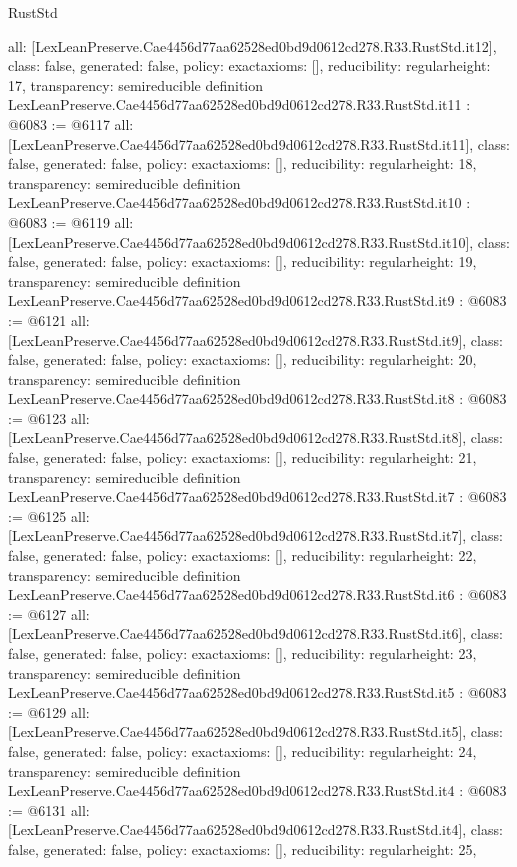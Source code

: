 \begin{lexlean}{RustStd}
\begin{coremodule}
{  all: [LexLeanPreserve.Cae4456d77aa62528ed0bd9d0612cd278.R33.RustStd.it12],
  class: false,
  generated: false,
  policy: exact{axioms: []},
  reducibility: regular{height: 17},
  transparency: semireducible
}
definition LexLeanPreserve.Cae4456d77aa62528ed0bd9d0612cd278.R33.RustStd.it11 : @6083 := @6117 {
  all: [LexLeanPreserve.Cae4456d77aa62528ed0bd9d0612cd278.R33.RustStd.it11],
  class: false,
  generated: false,
  policy: exact{axioms: []},
  reducibility: regular{height: 18},
  transparency: semireducible
}
definition LexLeanPreserve.Cae4456d77aa62528ed0bd9d0612cd278.R33.RustStd.it10 : @6083 := @6119 {
  all: [LexLeanPreserve.Cae4456d77aa62528ed0bd9d0612cd278.R33.RustStd.it10],
  class: false,
  generated: false,
  policy: exact{axioms: []},
  reducibility: regular{height: 19},
  transparency: semireducible
}
definition LexLeanPreserve.Cae4456d77aa62528ed0bd9d0612cd278.R33.RustStd.it9 : @6083 := @6121 {
  all: [LexLeanPreserve.Cae4456d77aa62528ed0bd9d0612cd278.R33.RustStd.it9],
  class: false,
  generated: false,
  policy: exact{axioms: []},
  reducibility: regular{height: 20},
  transparency: semireducible
}
definition LexLeanPreserve.Cae4456d77aa62528ed0bd9d0612cd278.R33.RustStd.it8 : @6083 := @6123 {
  all: [LexLeanPreserve.Cae4456d77aa62528ed0bd9d0612cd278.R33.RustStd.it8],
  class: false,
  generated: false,
  policy: exact{axioms: []},
  reducibility: regular{height: 21},
  transparency: semireducible
}
definition LexLeanPreserve.Cae4456d77aa62528ed0bd9d0612cd278.R33.RustStd.it7 : @6083 := @6125 {
  all: [LexLeanPreserve.Cae4456d77aa62528ed0bd9d0612cd278.R33.RustStd.it7],
  class: false,
  generated: false,
  policy: exact{axioms: []},
  reducibility: regular{height: 22},
  transparency: semireducible
}
definition LexLeanPreserve.Cae4456d77aa62528ed0bd9d0612cd278.R33.RustStd.it6 : @6083 := @6127 {
  all: [LexLeanPreserve.Cae4456d77aa62528ed0bd9d0612cd278.R33.RustStd.it6],
  class: false,
  generated: false,
  policy: exact{axioms: []},
  reducibility: regular{height: 23},
  transparency: semireducible
}
definition LexLeanPreserve.Cae4456d77aa62528ed0bd9d0612cd278.R33.RustStd.it5 : @6083 := @6129 {
  all: [LexLeanPreserve.Cae4456d77aa62528ed0bd9d0612cd278.R33.RustStd.it5],
  class: false,
  generated: false,
  policy: exact{axioms: []},
  reducibility: regular{height: 24},
  transparency: semireducible
}
definition LexLeanPreserve.Cae4456d77aa62528ed0bd9d0612cd278.R33.RustStd.it4 : @6083 := @6131 {
  all: [LexLeanPreserve.Cae4456d77aa62528ed0bd9d0612cd278.R33.RustStd.it4],
  class: false,
  generated: false,
  policy: exact{axioms: []},
  reducibility: regular{height: 25},
}
\end{coremodule}
\end{lexlean}
